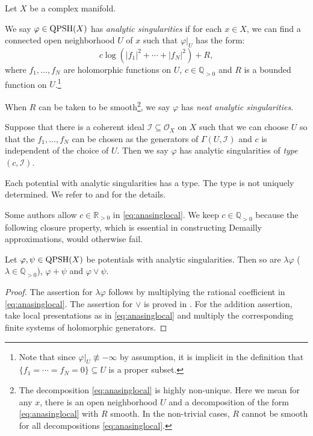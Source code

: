 Let $X$ be a complex manifold.
\begin{definition}\label{def:neatanasing}
    We say $\varphi\in \mathrm{QPSH}(X)$ has \emph{analytic singularities}  if for each $x\in X$, we can find a connected open neighborhood $U$ of $x$ such that $\varphi|_U$ has the form:
    \begin{equation}\label{eq:anasinglocal}
    c\log (|f_1|^2+\cdots+|f_N|^2)+R,
    \end{equation}
    where $f_1,\ldots,f_N$ are holomorphic functions on $U$, $c\in \mathbb{Q}_{>0}$ and $R$ is a bounded function on $U$.\footnote{Note that since $\varphi|_U\not\equiv -\infty$ by assumption, it is implicit in the definition that $\{f_1=\cdots=f_N=0\}\subseteq U$ is a proper subset.}


    When $R$ can be taken to be smooth\footnote{The decomposition \eqref{eq:anasinglocal} is highly non-unique. Here we mean for any $x$, there is an open neighborhood $U$ and a decomposition of the form \eqref{eq:anasinglocal} with $R$ smooth. In the non-trivial cases, $R$ cannot be smooth for all decompositions \eqref{eq:anasinglocal}.}, we say $\varphi$ has \emph{neat analytic singularities}.

    Suppose that there is a coherent ideal $\mathcal{I}\subseteq \mathcal{O}_X$ on $X$ such that we can choose $U$ so that the $f_1,\ldots,f_N$ can be chosen as the generators of $\Gamma(U,\mathcal{I})$ and $c$ is independent of the choice of $U$. Then we say $\varphi$ has analytic singularities of \emph{type} $(c,\mathcal{I})$.
\end{definition}
Each potential with analytic singularities has a type. The type is not uniquely determined.
We refer to \cite{Bou02} and \cite{Bou02b} for the details.

Some authors allow $c\in \mathbb{R}_{>0}$ in \eqref{eq:anasinglocal}. We keep $c\in \mathbb{Q}_{>0}$ because the following closure property, which is essential in constructing Demailly approximations, would otherwise fail.
\begin{proposition}\label{prop:analysingclosed}
    Let $\varphi,\psi\in \mathrm{QPSH}(X)$ be potentials with analytic singularities. Then so are $\lambda\varphi$ ($\lambda\in \mathbb{Q}_{>0}$), $\varphi+\psi$ and $\varphi\lor \psi$.
\end{proposition}
\begin{proof}
    The assertion for $\lambda\varphi$ follows by multiplying the rational coefficient in \eqref{eq:anasinglocal}. The assertion for $\lor$ is proved in \cite[Proposition~4.1.8]{Dem15}. For the addition assertion, take local presentations as in \eqref{eq:anasinglocal} and multiply the corresponding finite systems of holomorphic generators.
\end{proof}

